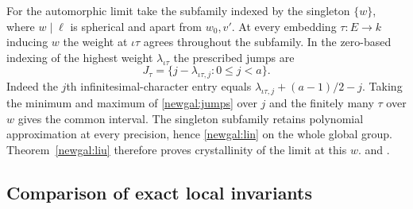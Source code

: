 For the automorphic limit take the subfamily indexed by the singleton
$\{w\}$, where $w\mid\ell$ is spherical and apart from $w_0,v'$.
At every embedding $\tau:E\to k$ inducing $w$ the weight at $\iota\tau$
agrees throughout the subfamily. In the zero-based indexing of the highest
weight $\lambda_{\iota\tau}$ the prescribed jumps are
\begin{equation}\label{newgal:jumps}
             J_\tau=\{j-\lambda_{\iota\tau,j}:0\le j<a\}.
\end{equation}
Indeed the $j$th infinitesimal-character entry equals
$\lambda_{\iota\tau,j}+(a-1)/2-j$. Taking the minimum and maximum of
\eqref{newgal:jumps} over $j$ and the finitely many $\tau$ over $w$
gives the common interval. The singleton subfamily retains polynomial
approximation at every precision, hence \eqref{newgal:lin} on the whole
global group. Theorem~\ref{newgal:liu} therefore proves crystallinity
of the limit at this $w$.
and .

\subsection{Comparison of exact local invariants}

